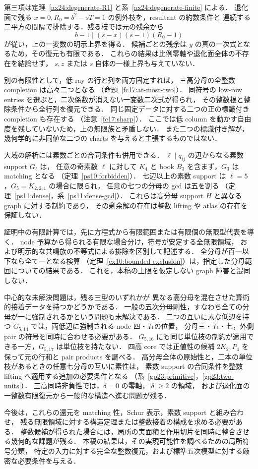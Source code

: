 第三項は定理~\ref{ax24:degenerate-R1} と系~\ref{ax24:degenerate-finite} による．
退化面で残る $x=0,R_0=b^2-sT=1$ の例外枝を，resultant の約数条件と
連続する二平方の間隔で排除する．残る枝では元の残余から
\[
 b-1\mid(s-x)(s-1)(R_0-1)
\]
が従い，上の一変数の明示上界を得る．
候補ごとの残余は $y$ の真の一次式となるため，その復元も有限である．
これらの結果は比例零軸や退化面全体の不存在を結論せず，
$s,z$ または $s$ 自体の一様上界も与えていない．

別の有限性として，低 ray の行と列を両方固定すれば，
三高分母の全整数 completion は高々二つとなる
（命題~\ref{fc17:at-most-two}）．
同符号の low-row entries を選ぶと，二次係数が消えない一変数二次式が得られ，
その整数根と整除条件から全行列を復元できる．
同じ固定データに対する二つの正の標識付き completion も存在する
（注意~\ref{fc17:sharp}）．
ここでは低 column を動かす自由度を残していないため，上の無限族と矛盾しない．
また二つの標識付き解が，幾何学的に非同値な二つの charts を与えると主張するものではない．

大域の解析には素数ごとの合同条件も併用できる．
$\ell\mid q_{ij}$ の辺からなる素数 support $G_\ell$ は，
任意の奇素数 $\ell$ に対して $K_4$ と book $B_3$ を含まず，$G_3$ は matching となる
（定理~\ref{ps10:forbidden}）．
七辺以上の素数 support は $\ell=5$，$G_5=K_{2,2,1}$ の場合に限られ，
任意の七つの分母の gcd は五を割る
（定理~\ref{ps11:dense}，系~\ref{ps11:dense-gcd}）．
これらは高分母 support $H$ と異なる graph に対する制約であり，
その剰余解の存在は整数 lifting や atlas の存在を保証しない．

証明中の有限計算では，先に方程式から有限範囲または有限個の無限型代表を導く．
node 予算から得られる有限な場合分け，符号が安定する全無限領域，
および明示的な共鳴族の不等式による排除を区別して記述する．
全分母が百一以下なら全て一となる検算
（定理~\ref{ex10:bounded-exclusion}）は，指定した分母範囲についての結果である．
これを，本稿の上限を仮定しない graph 障害と混同しない．

中心的な未解決問題は，残る三型のいずれかが
異なる高分母を混在させた算術的接着データを持つかどうかである．
一般の五次分母剛性，すなわち全ての分母が一に強制されるかという問題も未解決である．
二つの互いに素な低辺を持つ $G_{5,14}$ では，両低辺に強制される node 四・五の位置，
分母三・五・七，外側 pair の符号を同時に合わせる必要がある．
$G_{5,16}$ にも同じ単位枝の制約が適用できる一方，$G_{5,17}$ は単位枝を持たない．
四高 core では正値性の候補 $2K_2,P_4$ を保って元の行和と pair products を調べる．
高分母全体の原始性と，二本の単位枝があるときの任意七分母の互いに素性は，
素数 support の合同条件を整数 lifting へ適用する追加の必要条件となる
（系~\ref{gp23:primitive}，\ref{gp23:two-units}）．
三高同時非負性では，$\delta=0$ の零軸，$|\delta|\ge2$ の領域，
および退化面の一整数有限復元から一般的な構造へ進む問題が残る．

今後は，これらの還元を matching 性，Schur 表示，素数 support と組み合わせ，
残る無限領域に対する構造定理または整数接着の構成を求める必要がある．
整数候補が得られた場合には，局所の実面積と作用切片を同時に整合させる幾何的な課題が残る．
本稿の結果は，その実現可能性を調べるための局所符号分類，
特定の入力に対する完全な整数復元，および標準五次模型に対する厳密な必要条件を与える．
